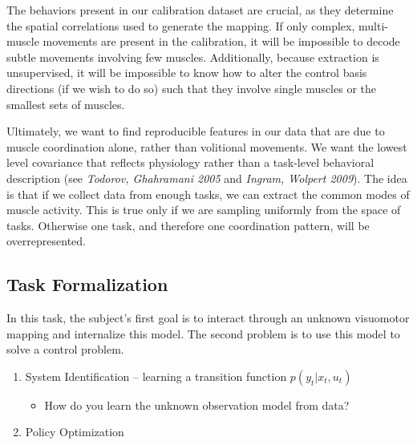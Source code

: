 {            The behaviors present in our calibration dataset are
            crucial, as they determine the spatial correlations used to
            generate the mapping. If only complex, multi-muscle
            movements are present in the calibration, it will be
            impossible to decode subtle movements involving few muscles.
            Additionally, because extraction is unsupervised, it will be
            impossible to know how to alter the control basis directions
            (if we wish to do so) such that they involve single muscles
            or the smallest sets of muscles.

            Ultimately, we want to find reproducible features in our
            data that are due to muscle coordination alone, rather than
            volitional movements. We want the lowest level covariance
            that reflects physiology rather than a task-level behavioral
            description (see \emph{Todorov, Ghahramani 2005} and
            \emph{Ingram, Wolpert 2009}). The idea is that if we collect
            data from enough tasks, we can extract the common modes of
            muscle activity. This is true only if we are sampling
            uniformly from the space of tasks. Otherwise one task, and
            therefore one coordination pattern, will be overrepresented.

            \hypertarget{task-formalization}{%
            \subsection{Task Formalization}\label{task-formalization}}

            In this task, the subject's first goal is to interact
            through an unknown visuomotor mapping and internalize this
            model. The second problem is to use this model to solve a
            control problem.

            \begin{enumerate}
            \def\labelenumi{\arabic{enumi}.}
            \tightlist
            \item
              System Identification -- learning a transition function
              \(p(y_t|x_t, u_t)\)

              \begin{itemize}
              \tightlist
              \item
                How do you learn the unknown observation model from
                data?
              \end{itemize}
            \item
              Policy Optimization


\end{enumerate}}
